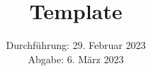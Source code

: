 

\subject{\texorpdfstring{\vspace{2ex}}{}123\texorpdfstring{\vspace{-2ex}}{}} %
\title{Template} %
\date{
	Durchführung: 29. Februar 2023%
	\\ Abgabe: 6. März 2023%
}



\maketitle
\thispagestyle{empty}
\tableofcontents
\newpage







\printbibliography{}

\newpage



